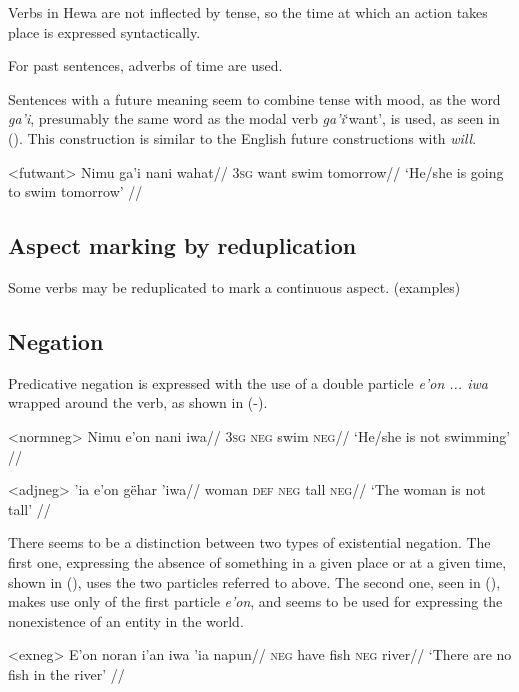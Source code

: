 \documentclass[12pt]{article}
\begin{document}
Verbs in Hewa are not inflected by tense, so the time at which an action takes place is expressed syntactically. %

For past sentences, adverbs of time are used.

Sentences with a future meaning seem to combine tense with mood, as the word \textit{ga'i}, presumably the same word as the modal verb \textit{ga'i}`want', is used, as seen in (). This construction is similar to the English future constructions with \textit{will}.

\ex<futwant>
\begingl %
\gla Nimu ga'i nani wahat//
\glb \textsc{3sg} want swim tomorrow//
\glft `He/she is going to swim tomorrow' // 
\endgl
\xe

\subsection{Aspect marking by reduplication}

Some verbs may be reduplicated to mark a continuous aspect. (examples)

\subsection{Negation}\label{sec:neg}

Predicative negation is expressed with the use of a double particle \textit{e'on ... iwa} wrapped around the verb, as shown in (-).


\ex<normneg>
\begingl %
\gla Nimu e'on nani iwa//
\glb \textsc{3sg} \textsc{neg} swim \textsc{neg}//
\glft `He/she is not swimming' // 
\endgl
\xe

\ex<adjneg>
\begingl %
 'ia e'on gëhar 'iwa//
\glb woman \textsc{def} \textsc{neg} tall \textsc{neg}//
\glft `The woman is not tall' // 
\endgl
\xe

There seems to be a distinction between two types of existential negation. The first one, expressing the absence of something in a given place or at a given time, shown in (), uses the two particles referred to above. The second one, seen in (), makes use only of the first particle \textit{e'on}, and seems to be used for expressing the nonexistence of an entity in the world.

\ex<exneg>
\begingl %
\gla E'on noran i'an iwa 'ia napun//
\glb \textsc{neg} have fish \textsc{neg} \Loc{} river//
\glft `There are no fish in the river' // 
\endgl
\xe
\end{document}
